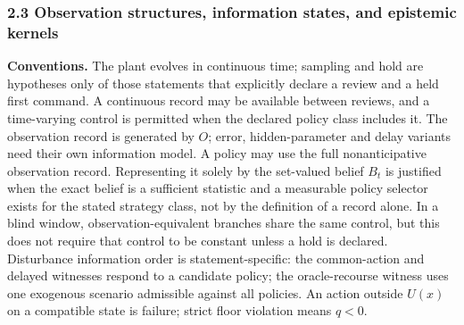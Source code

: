 \documentclass[10pt,twocolumn]{article}
\theoremstyle{definition}
\begin{document}
\subsubsection{2.3 Observation structures, information states, and
epistemic
kernels}\label{calc-observation-structures-information-states-and-epistemic-kernels}

\textbf{Conventions.} The plant evolves in continuous time; sampling and hold are hypotheses only of those statements that explicitly declare a review and a held first command. A continuous record may be available between reviews, and a time-varying control is permitted when the declared policy class includes it. The observation record is generated by \(O\); error, hidden-parameter and delay variants need their own information model. A policy may use the full nonanticipative observation record. Representing it solely by the set-valued belief \(B_t\) is justified when the exact belief is a sufficient statistic and a measurable policy selector exists for the stated strategy class, not by the definition of a record alone. In a blind window, observation-equivalent branches share the same control, but this does not require that control to be constant unless a hold is declared. Disturbance information order is statement-specific: the common-action and delayed witnesses respond to a candidate policy; the oracle-recourse witness uses one exogenous scenario admissible against all policies. An action outside \(U(x)\) on a compatible state is failure; strict floor violation means \(q<0\).
\end{document}
